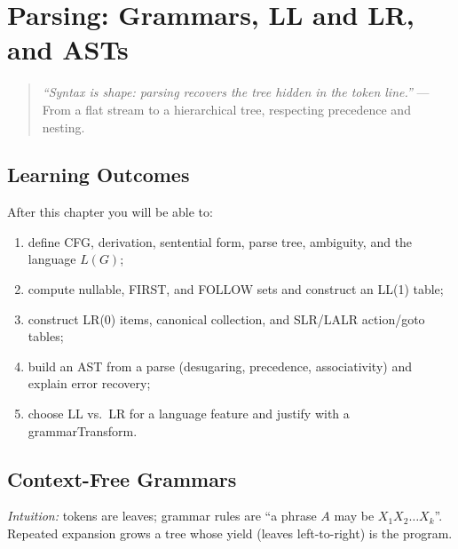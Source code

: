 \chapter{Parsing: Grammars, LL and LR, and ASTs}
\label{ch:parsing}

\begin{quote}
\emph{``Syntax is shape: parsing recovers the tree hidden in the token line.''} --- From a flat stream to a hierarchical tree, respecting precedence and nesting.
\end{quote}

\noindent{}
\vspace{0.4em}

\section*{Learning Outcomes}
After this chapter you will be able to:
\begin{enumerate}[label=(L\arabic*)]
    \item define CFG, derivation, sentential form, parse tree, ambiguity, and the language $L(G)$;
    \item compute nullable, FIRST, and FOLLOW sets and construct an LL(1) table;
    \item construct LR(0) items, canonical collection, and SLR/LALR action/goto tables;
    \item build an AST from a parse (desugaring, precedence, associativity) and explain error recovery;
    \item choose LL vs.\ LR for a language feature and justify with a grammarTransform.
\end{enumerate}

\section{Context-Free Grammars}
\label{sec:cfgs}
\emph{Intuition:} tokens are leaves; grammar rules are ``a phrase $A$ may be $X_1X_2\dots X_k$''. Repeated expansion grows a tree whose yield (leaves left-to-right) is the program.

